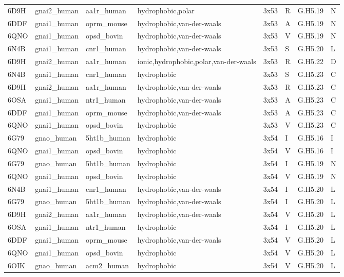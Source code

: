 \begin{landscape}
\begin{longtable}{llllllll}
\addlinespace
6D9H & gnai2\_human & aa1r\_human & hydrophobic,polar & 3x53 & R & G.H5.19 & N\\
6DDF & gnai1\_human & oprm\_mouse & hydrophobic,van-der-waals & 3x53 & A & G.H5.19 & N\\
6QNO & gnai1\_human & opsd\_bovin & hydrophobic,van-der-waals & 3x53 & V & G.H5.19 & N\\
6N4B & gnai1\_human & cnr1\_human & hydrophobic,van-der-waals & 3x53 & S & G.H5.20 & L\\
6D9H & gnai2\_human & aa1r\_human & ionic,hydrophobic,polar,van-der-waals & 3x53 & R & G.H5.22 & D\\
\addlinespace
6N4B & gnai1\_human & cnr1\_human & hydrophobic & 3x53 & S & G.H5.23 & C\\
6D9H & gnai2\_human & aa1r\_human & hydrophobic,van-der-waals & 3x53 & R & G.H5.23 & C\\
6OSA & gnai1\_human & ntr1\_human & hydrophobic,van-der-waals & 3x53 & A & G.H5.23 & C\\
6DDF & gnai1\_human & oprm\_mouse & hydrophobic,van-der-waals & 3x53 & A & G.H5.23 & C\\
6QNO & gnai1\_human & opsd\_bovin & hydrophobic & 3x53 & V & G.H5.23 & C\\
\addlinespace
6G79 & gnao\_human & 5ht1b\_human & hydrophobic & 3x54 & I & G.H5.16 & I\\
6QNO & gnai1\_human & opsd\_bovin & hydrophobic & 3x54 & V & G.H5.16 & I\\
6G79 & gnao\_human & 5ht1b\_human & hydrophobic & 3x54 & I & G.H5.19 & N\\
6QNO & gnai1\_human & opsd\_bovin & hydrophobic & 3x54 & V & G.H5.19 & N\\
6N4B & gnai1\_human & cnr1\_human & hydrophobic,van-der-waals & 3x54 & I & G.H5.20 & L\\
\addlinespace
6G79 & gnao\_human & 5ht1b\_human & hydrophobic,van-der-waals & 3x54 & I & G.H5.20 & L\\
6D9H & gnai2\_human & aa1r\_human & hydrophobic,van-der-waals & 3x54 & V & G.H5.20 & L\\
6OSA & gnai1\_human & ntr1\_human & hydrophobic & 3x54 & I & G.H5.20 & L\\
6DDF & gnai1\_human & oprm\_mouse & hydrophobic,van-der-waals & 3x54 & V & G.H5.20 & L\\
6QNO & gnai1\_human & opsd\_bovin & hydrophobic & 3x54 & V & G.H5.20 & L\\
\addlinespace
6OIK & gnao\_human & acm2\_human & hydrophobic & 3x54 & V & G.H5.20 & L\\

\end{longtable}
\end{landscape}
